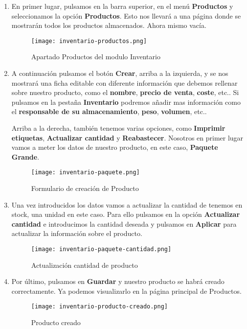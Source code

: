 \begin{enumerate}
    \item En primer lugar, pulsamos en la barra superior, en el menú \textbf{Productos} y seleccionamos la opción \textbf{Productos}. Esto nos llevará a una página donde se mostrarán todos los productos almacenados. Ahora mismo vacía.

    \begin{figure}[ht]
        \centering
        \texttt{[image: inventario-productos.png]}
        \caption{Apartado Productos del modulo Inventario}
    \end{figure}

    \item A continuación pulsamos el botón \textbf{Crear}, arriba a la izquierda, y se nos mostrará una ficha editable con diferente información que debemos rellenar sobre nuestro producto, como el \textbf{nombre}, \textbf{precio de venta}, \textbf{coste}, etc.. Si pulsamos en la pestaña \textbf{Inventario} podremos añadir mas información como el \textbf{responsable de su almacenamiento}, \textbf{peso}, \textbf{volumen}, etc..

    Arriba a la derecha, también tenemos varias opciones, como \textbf{Imprimir etiquetas}, \textbf{Actualizar cantidad} y \textbf{Reabastecer}. Nosotros en primer lugar vamos a meter los datos de nuestro producto, en este caso, \textbf{Paquete Grande}.

    \begin{figure}[ht]
        \centering
        \texttt{[image: inventario-paquete.png]}
        \caption{Formulario de creación de Producto}
    \end{figure}

    \vspace{5ex}

    \item Una vez introducidos los datos vamos a actualizar la cantidad de tenemos en stock, una unidad en este caso. Para ello pulsamos en la opción \textbf{Actualizar cantidad} e introducimos la cantidad deseada y pulsamos en \textbf{Aplicar} para actualizar la información sobre el producto.

    \begin{figure}[ht]
        \centering
        \texttt{[image: inventario-paquete-cantidad.png]}
        \caption{Actualización cantidad de producto}
    \end{figure}

    \item Por último, pulsamos en \textbf{Guardar} y nuestro producto se habrá creado correctamente. Ya podemos visualizarlo en la página principal de Productos.

    \begin{figure}[ht]
        \centering
        \texttt{[image: inventario-producto-creado.png]}
        \caption{Producto creado}
    \end{figure}
\end{enumerate}

